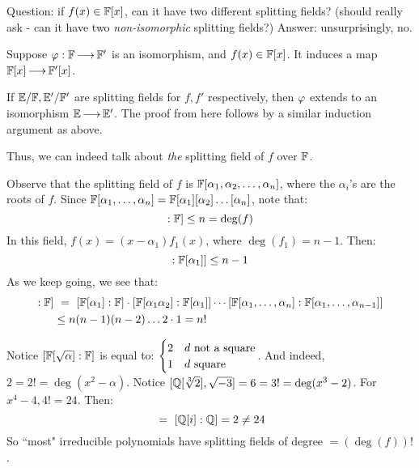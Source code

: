 Question: if $ f(x) \in \mathbb{F}[x] $, can it have two different splitting fields?
(should really ask - can it have two \textit{non-isomorphic} splitting fields?)
Answer: unsurprisingly, no.

Suppose $ \operatorname{\varphi}: \mathbb{F} \operatorname{\longrightarrow} \mathbb{F}' $ is an isomorphism, and $ f(x) \in \mathbb{F}[x] $.
It induces a map $ \mathbb{F}[x] \operatorname{\longrightarrow} \mathbb{F}'[x] $.

If $ \mathbb{E}/\mathbb{F}, \mathbb{E}'/\mathbb{F}' $ are splitting fields for $ f, f' $ respectively, then
$ \operatorname{\varphi} $ extends to an isomorphism $ \mathbb{E} \operatorname{\longrightarrow} \mathbb{E}' $.
The proof from here follows by a similar induction argument as above.

Thus, we can indeed talk about \textit{the} splitting field of $ f $ over
$ \mathbb{F} $.

Observe that the splitting field of $ f $ is $ \mathbb{F}[\alpha_{1}, \alpha_{2},
\dots, \alpha_{n}] $, where the $ \alpha_{i} $'s are the roots of $ f $.
Since $ \mathbb{F}[\alpha_{1}, \dots, \alpha_{n}] = \mathbb{F}[\alpha_{1}][\alpha_{2}]\dots
[\alpha_{n}] $, note that:
\begin{equation*}
    [\bF[\alpha_{1}]:\bF] \leq n = \deg(f)
\end{equation*}
In this field, $ f(x) = (x-\alpha_{1})f_{1}(x) $, where $ \deg(f_{1}) = n-1 $.
Then:
\begin{equation*}
    [\bF[\alpha_{2}]:\bF[\alpha_{1}]] \leq n-1
\end{equation*}
As we keep going, we see that:
\begin{align*}
    [\bF[\alpha_{1}, \dots, \alpha_{n}]: \bF] & \ = \
    [\bF[\alpha_{1}]:\bF]\cdot[\bF[\alpha_{1}\alpha_{2}]:\bF[\alpha_{1}]] \cdots
    [\bF[\alpha_{1}, \dots, \alpha_{n}]:\bF[\alpha_{1},\dots,\alpha_{n-1}]] \\
        & \leq n(n-1)(n-2)\dots 2\cdot 1 = n!
\end{align*}

\begin{xmp}[source=Primary Source Material]
    Notice $ [\mathbb{F}[\sqrt{\alpha}]:\mathbb{F}] $ is equal to:
    $ \begin{cases} 2 & d \textrm{ not a square} \\ 1 & d \textrm{ square}
    \end{cases} $.
    And indeed, $ 2 = 2! = \deg(x^{2}-\alpha) $. \vsp
    Notice $ [\mathbb{Q}[\sqrt[3]{2}], \sqrt{-3}] = 6 = 3! = \deg(x^{3}-2) $. \vsp
    For $ x^{4}-4, 4! = 24 $. Then:
    \begin{equation*}
        [\trm{splitting field}:\bQ] \ = \ [\bQ[i]:\bQ] = 2 \neq 24
    \end{equation*}
    So ``most" irreducible polynomials have splitting fields of degree
    $ = (\deg(f))! $.
\end{xmp}

